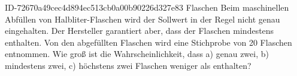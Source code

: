 \begin{exercise}
      {ID-72670a49cec4d894ec513cb0a00b90226d327e83}
      {Flaschen}
  \ifproblem\problem
    Beim maschinellen Abfüllen von Halbliter-Flaschen wird der \glqq Sollwert\grqq{}
     in der Regel nicht genau eingehalten. Der Hersteller garantiert
    aber, dass  der Flaschen mindestens  enthalten. Von den
    abgefüllten Flaschen wird eine Stichprobe von 20 Flaschen entnommen. Wie groß
    ist die Wahrscheinlichkeit, dass
    a) genau zwei,
    b) mindestens zwei,
    c) höchstens zwei
    Flaschen weniger als  enthalten?
  \fi
\end{exercise}
